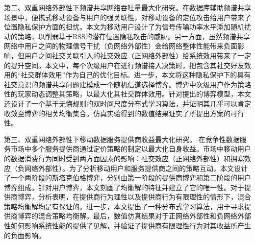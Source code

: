 第二、双重网络外部性下频谱共享网络吞吐量最大化研究。在数据库辅助频谱共享场景中，便携式移动设备与用户的强关联性，对移动设备的定位攻击给用户带来了位置隐私保护方面的担忧。本文为移动用户设计了为信号传输功率水平添加随机扰动的策略，以削弱基于RSS的潜在位置隐私攻击的威胁。另一方面，虽然频谱共享网络中用户之间的物理信号干扰（{\kaishu 负网络外部性}）会给网络整体性能带来负面影响，但用户之间社交关联引入的社交效应（{\kaishu 正网络外部性}）给系统效用带来了一定的提升空间。本文中，每个次级用户在进行频谱接入决策时，把包含其社交好友效用的“社交群体效用”作为自己的优化目标。进一步，本文将这种隐私保护下的具有社交意识的频谱共享问题建模成一个随机信道选择博弈。博弈中次级用户作为策略性的玩家动态调整其策略，以最大化其社交群体效用。针对提出的博弈模型，本文还设计了一个基于无悔规则的双时间尺度分布式学习算法，并证明其几乎可以肯定收敛至博弈的相关均衡集合。仿真实验得到的数值结果证实了所提出方案的可行性。

第三、双重网络外部性下移动数据服务提供商收益最大化研究。
在竞争性数据服务市场中多个服务提供商通过定价策略的制定以最大化自身收益。市场中移动用户的数据消费行为同时受到两方面因素的影响：社交效应（{\kaishu 正网络外部性}）和拥塞效应（{\kaishu 负网络外部性}）。为了分析移动用户和服务提供商之间的策略互动，本文设计了一个两阶段的斯塔克伯格博弈，分别由第一阶段的提供商博弈和第二阶段的用户博弈组成。针对用户博弈，本文刻画了均衡解的特征并建立了它的唯一性。对于提供商博弈，分析表明，在提供商行为理性以及提供商行为有限理性的情形下，混合策略均衡解均是有保证的。进一步，本文提出了一种分布式学习算法，用于寻求提供商博弈的混合策略均衡解。最后，数值仿真结果对于正网络外部性和负网络外部性如何影响系统性能的提供了见解，并验证了提供商有限理性行为对其收益所产生的负面影响。


